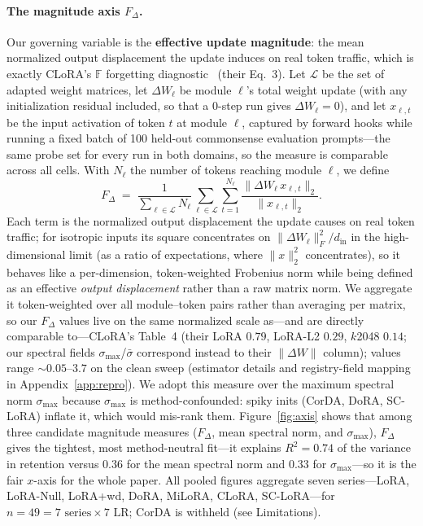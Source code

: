 \documentclass[11pt]{article}
\newcommand{\dw}{F_{\Delta}}
\newcommand{\smax}{\sigma_{\max}}
\begin{document}
\paragraph{The magnitude axis $\dw$.} Our governing variable is the
\textbf{effective update magnitude}: the mean normalized output displacement the
update induces on real token traffic, which is exactly CLoRA's $\mathbb{F}$
forgetting diagnostic~\citep{clora} (their Eq.~3). Let $\mathcal{L}$ be
the set of adapted weight matrices, let $\Delta W_\ell$ be module $\ell$'s total
weight update (with any initialization residual included, so that a $0$-step run
gives $\Delta W_\ell = 0$), and let $x_{\ell,t}$ be the input activation of token
$t$ at module $\ell$, captured by forward hooks while running a fixed batch of 100
held-out commonsense evaluation prompts---the same probe set for every run in both
domains, so the measure is comparable across all cells. With $N_\ell$ the
number of tokens reaching module $\ell$, we define
\begin{equation}\label{eq:fdelta}
  \dw \;=\; \frac{1}{\sum_{\ell\in\mathcal{L}} N_\ell}
  \sum_{\ell\in\mathcal{L}} \sum_{t=1}^{N_\ell}
  \frac{\lVert \Delta W_\ell\, x_{\ell,t} \rVert_2}{\lVert x_{\ell,t} \rVert_2}.
\end{equation}
Each term is the normalized output displacement the update causes on real token
traffic; for isotropic inputs its square concentrates on
$\lVert\Delta W_\ell\rVert_F^2 / d_{\text{in}}$ in the high-dimensional limit (as a
ratio of expectations, where $\lVert x\rVert_2^2$ concentrates), so it behaves like a
per-dimension, token-weighted Frobenius norm while being defined as an effective
\emph{output displacement} rather than a raw matrix norm. We aggregate it
token-weighted over all module--token pairs rather than averaging per matrix, so our
$\dw$ values live on the same normalized scale as---and are directly comparable
to---CLoRA's Table~4 (their LoRA $0.79$, LoRA-L2 $0.29$, $k$2048 $0.14$; our spectral
fields $\smax$/$\bar\sigma$ correspond instead to their $\lVert\Delta W\rVert$
column);
values range $\sim\!0.05$--$3.7$ on the clean sweep (estimator details and
registry-field mapping in Appendix~\ref{app:repro}).
We adopt this measure over the maximum spectral norm $\smax$ because $\smax$ is
method-confounded: spiky inits (CorDA, DoRA, SC-LoRA) inflate it, which would
mis-rank them. Figure~\ref{fig:axis} shows that among three candidate magnitude
measures ($\dw$, mean spectral norm, and $\smax$), $\dw$ gives the tightest, most
method-neutral fit---it explains $R^2\!=\!0.74$ of the variance in retention
versus $0.36$ for the mean spectral norm and $0.33$ for $\smax$---so it is the fair
$x$-axis for the whole paper. All pooled figures aggregate seven series---LoRA, LoRA-Null,
LoRA{+}wd, DoRA, MiLoRA, CLoRA, SC-LoRA---for
$n\!=\!49\!=\!7\text{ series}\times7\text{ LR}$; CorDA is withheld
(see Limitations).
\end{document}
